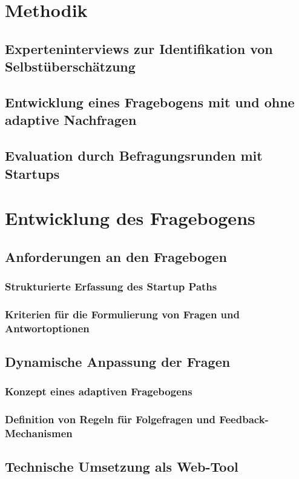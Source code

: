 \chapter{Methodik}

\section{Experteninterviews zur Identifikation von Selbstüberschätzung}
\section{Entwicklung eines Fragebogens mit und ohne adaptive Nachfragen}
\section{Evaluation durch  Befragungsrunden mit Startups}

\chapter{Entwicklung des Fragebogens}

\section{Anforderungen an den Fragebogen}
\subsection{Strukturierte Erfassung des Startup Paths}
\subsection{Kriterien für die Formulierung von Fragen und Antwortoptionen}

\section{Dynamische Anpassung der Fragen}
\subsection{Konzept eines adaptiven Fragebogens}
\subsection{Definition von Regeln für Folgefragen und Feedback-Mechanismen}

\section{Technische Umsetzung als Web-Tool}

